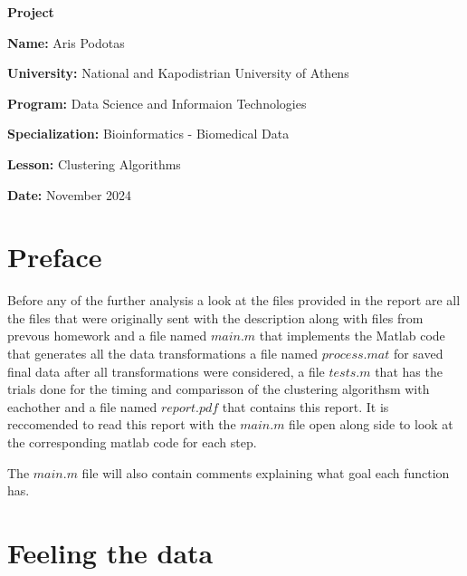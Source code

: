 \documentclass[12pt, a4paper]{article}
\begin{document}
\begin{titlepage}
    \centering
    {\huge \textbf{Project}\par}
    \vspace{0.5cm}
    {\Large \textbf{Name:} Aris Podotas\par}
    \vspace{0.5cm}
    {\large \textbf{University:} National and Kapodistrian University of Athens\par}
    \vspace{0.5cm}
    {\large \textbf{Program:} Data Science and Informaion Technologies\par}
    \vspace{0.5cm}
    {\large \textbf{Specialization:} Bioinformatics - Biomedical Data\par}
    \vspace{0.5cm}
    {\large \textbf{Lesson:} Clustering Algorithms \par}
    \vspace{0.5cm}
    {\large \textbf{Date:} November 2024\par}
    \tableofcontents
\end{titlepage}

\section{Preface}

Before any of the further analysis a look at the files provided in the report are all the files that were originally sent with the description along with files from prevous homework and a file named $main.m$ that implements the Matlab code that generates all the data transformations a file named $process.mat$ for saved final data after all transformations were considered, a file $tests.m$ that has the trials done for the timing and comparisson of the clustering algorithsm with eachother and a file named $report.pdf$ that contains this report. It is reccomended to read this report with the $main.m$ file open along side to look at the corresponding matlab code for each step.
\newline

The $main.m$ file will also contain comments explaining what goal each function has.

\section{Feeling the data}
\end{document}
